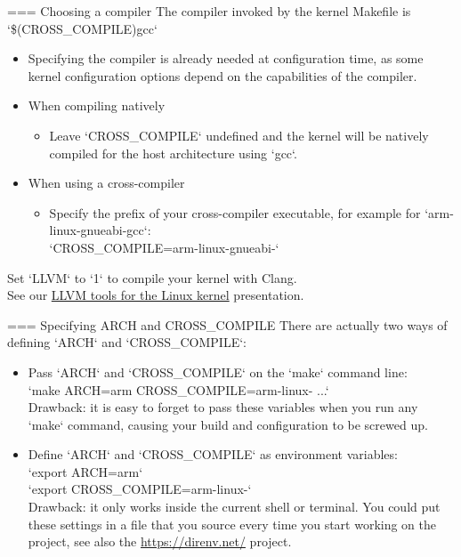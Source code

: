=== Choosing a compiler
  The compiler invoked by the kernel Makefile is `\$(CROSS_COMPILE)gcc`
  \begin{itemize}
    \item Specifying the compiler is already needed at configuration
	  time, as some kernel configuration options depend on the
          capabilities of the compiler.
    \item When compiling natively
      \begin{itemize}
	 \item Leave `CROSS_COMPILE` undefined and the kernel
	    will be natively compiled for the host architecture
            using `gcc`.
      \end{itemize}
    \item When using a cross-compiler
      \begin{itemize}
      \item Specify the prefix of your cross-compiler executable, for
            example for `arm-linux-gnueabi-gcc`:\\
          `CROSS_COMPILE=arm-linux-gnueabi-`
      \end{itemize}
  \end{itemize}
  Set `LLVM` to `1` to compile your kernel with Clang.\\
  See our \href{https://bootlin.com/pub/conferences/2022/lee/opdenacker-llvm-tools-for-linux-kernel/opdenacker-llvm-tools-for-linux-kernel.pdf}
  {LLVM tools for the Linux kernel} presentation.


=== Specifying ARCH and CROSS\_COMPILE
  There are actually two ways of defining `ARCH` and `CROSS_COMPILE`:
  \begin{itemize}
  \item Pass `ARCH` and `CROSS_COMPILE` on the `make`
    command line: \\
    `make ARCH=arm CROSS_COMPILE=arm-linux- ...` \\
    Drawback: it is easy to forget to pass these variables when
    you run any `make` command, causing your build and
    configuration to be screwed up.
  \item Define `ARCH` and `CROSS_COMPILE` as environment
    variables: \\
    `export ARCH=arm` \\
    `export CROSS_COMPILE=arm-linux-` \\
    Drawback: it only works inside the current shell or terminal. You
    could put these settings in a file that you source every time you
    start working on the project, see also the
    \url{https://direnv.net/} project.
  \end{itemize}


